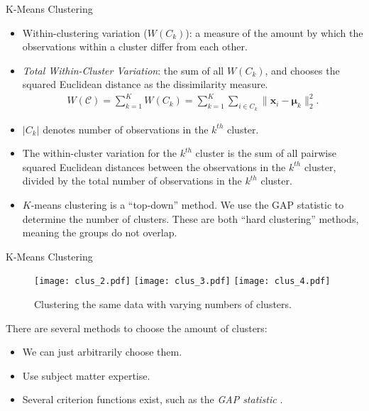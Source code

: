 \documentclass[8pt]{beamer}
\newcommand{\mydef}[1]{\textcolor{SteelBlue3}{\textit{#1}}} %
\begin{document}
\begin{frame}{K-Means Clustering}

\begin{itemize}
\item Within-clustering variation ($W(C_{k})$): a measure of the amount by which the observations within a cluster differ from each other. 
\item \textit{Total Within-Cluster Variation}: the sum of all $W(C_k)$, and chooses the squared Euclidean distance as the dissimilarity measure.
    \begin{align}
     \label{kmeans}
      W(\mathcal{C}) = \sum_{k=1}^K W(C_k) = \sum_{k=1}^K \sum_{i \in C_k} \| \bm{x}_i - \bm{\mu}_k \|_2^2.
    \end{align}
\item $|C_{k}|$ denotes number of observations in the $k^{th}$ cluster. 
\item The within-cluster variation for the $k^{th}$ cluster is the sum of all pairwise squared Euclidean distances between the observations in the $k^{th}$ cluster, divided by the total number of observations in the $k^{th}$ cluster.
\item $K$-means clustering is a ``top-down'' method. We use the GAP statistic \cite{tibshirani2001estimating} to determine the number of clusters. These are both ``hard clustering'' methods, meaning the groups do not overlap. 
\end{itemize} 
\end{frame}

\begin{frame}{K-Means Clustering}
\begin{figure}
    \centering
    \texttt{[image: clus\_2.pdf]}
    \texttt{[image: clus\_3.pdf]}
    \texttt{[image: clus\_4.pdf]}
    \caption{Clustering the same data with varying numbers of clusters.}
    \label{mult_cluster}
\end{figure} %

There are several methods to choose the amount of clusters: %
\begin{itemize}
    \item We can just arbitrarily choose them. %
    \item Use subject matter expertise. %
    \item Several criterion functions exist, such as the \mydef{GAP statistic} \cite{tibshirani2001estimating}.
\end{itemize}
    
\end{frame}
\end{document}
